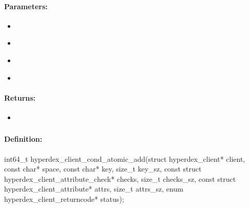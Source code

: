 \paragraph{Parameters:}
\begin{itemize}[noitemsep]
\item {}\\

\item {}\\

\item {}\\

\item {}\\

\end{itemize}

\paragraph{Returns:}
\begin{itemize}[noitemsep]
\item {}\\

\end{itemize}

\pagebreak
\subsubsection{}
\label{api:c:cond_atomic_add}


\paragraph{Definition:}
\begin{ccode}
int64_t hyperdex_client_cond_atomic_add(struct hyperdex_client* client,
        const char* space,
        const char* key, size_t key_sz,
        const struct hyperdex_client_attribute_check* checks, size_t checks_sz,
        const struct hyperdex_client_attribute* attrs, size_t attrs_sz,
        enum hyperdex_client_returncode* status);
\end{ccode}

